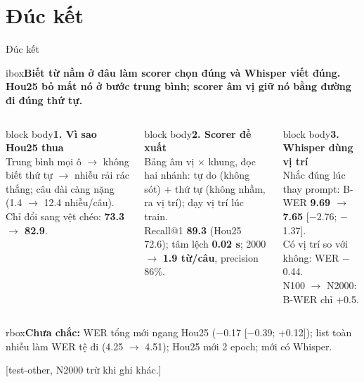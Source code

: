 \documentclass[aspectratio=169,xcolor=table]{beamer}
\newcommand{\src}[1]{\par\vfill{\tiny\color{TextGray}[#1]}}
\newcommand{\ra}{$\rightarrow$}
\newcommand{\nbox}[2][block body]{\begin{beamercolorbox}[sep=0.45em,rounded=true]{#1}\footnotesize #2\end{beamercolorbox}}
\newcommand{\yeu}[1]{\begin{beamercolorbox}[sep=0.40em,rounded=true]{rbox}\footnotesize #1\end{beamercolorbox}}
\newcommand{\nb}[1]{\textcolor{Accent}{#1}}
\newcommand{\insight}[1]{\begin{beamercolorbox}[sep=0.55em,rounded=true]{ibox}\small\bfseries #1\end{beamercolorbox}\vspace{0.15cm}}
\begin{document}
\section{Đúc kết}
\begin{frame}{Đúc kết}
\insight{Biết \nb{từ nằm ở đâu} làm scorer \nb{chọn đúng} và Whisper \nb{viết đúng}. Hou25 bỏ mất nó ở bước trung bình; scorer âm vị giữ nó bằng đường đi đúng thứ tự.}
\begin{columns}[T]
\nbox{\textbf{1. Vì sao Hou25 thua}\\[2pt]\scriptsize
Trung bình mọi ô \ra{} không biết thứ tự \ra{} nhiễu rải rác thắng; câu dài càng nặng (1.4 \ra{} 12.4 nhiễu/câu).\\[1pt]
Chỉ đổi sang vệt chéo: \textbf{73.3 \ra{} 82.9}.}
\nbox{\textbf{2. Scorer đề xuất}\\[2pt]\scriptsize
Bảng âm vị $\times$ khung, đọc hai nhánh: tự do (không sót) + thứ tự (không nhầm, ra vị trí); dạy vị trí lúc train.\\[1pt]
Recall@1 \textbf{89.3} (Hou25 72.6); tâm lệch \textbf{0.02 s}; 2000 \ra{} \textbf{1.9 từ/câu}, precision 86\%.}
\nbox{\textbf{3. Whisper dùng vị trí}\\[2pt]\scriptsize
Nhắc đúng lúc thay prompt: B-WER \textbf{9.69 \ra{} 7.65} [$-$2.76; $-$1.37].\\[1pt]
Có vị trí so với không: WER $-$0.44.\\[1pt]
N100 \ra{} N2000: B-WER chỉ +0.5.}
\end{columns}
\vspace{0.02cm}
\yeu{\scriptsize\textbf{Chưa chắc:} WER tổng mới ngang Hou25 ($-$0.17 [$-$0.39; +0.12]); list toàn nhiễu làm WER tệ đi (4.25 \ra{} 4.51); Hou25 mới 2 epoch; mới có Whisper.}
\src{test-other, N2000 trừ khi ghi khác.}
\end{frame}
\end{document}
